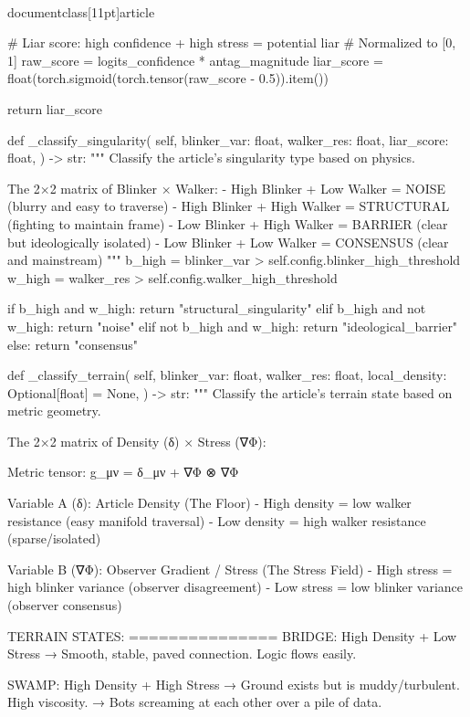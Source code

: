 \\documentclass[11pt]{article}
\begin{document}
\begin{CodeBlock}
        # Liar score: high confidence + high stress = potential liar
        # Normalized to [0, 1]
        raw_score = logits_confidence * antag_magnitude
        liar_score = float(torch.sigmoid(torch.tensor(raw_score - 0.5)).item())

        return liar_score

    def _classify_singularity(
        self,
        blinker_var: float,
        walker_res: float,
        liar_score: float,
    ) -> str:
        """
        Classify the article's singularity type based on physics.

        The 2×2 matrix of Blinker × Walker:
        - High Blinker + Low Walker = NOISE (blurry and easy to traverse)
        - High Blinker + High Walker = STRUCTURAL (fighting to maintain frame)
        - Low Blinker + High Walker = BARRIER (clear but ideologically isolated)
        - Low Blinker + Low Walker = CONSENSUS (clear and mainstream)
        """
        b_high = blinker_var > self.config.blinker_high_threshold
        w_high = walker_res > self.config.walker_high_threshold

        if b_high and w_high:
            return "structural_singularity"
        elif b_high and not w_high:
            return "noise"
        elif not b_high and w_high:
            return "ideological_barrier"
        else:
            return "consensus"

    def _classify_terrain(
        self,
        blinker_var: float,
        walker_res: float,
        local_density: Optional[float] = None,
    ) -> str:
        """
        Classify the article's terrain state based on metric geometry.

        The 2×2 matrix of Density (δ) × Stress (∇Φ):

        Metric tensor: g_μν = δ_μν + ∇Φ ⊗ ∇Φ

        Variable A (δ): Article Density (The Floor)
            - High density = low walker resistance (easy manifold traversal)
            - Low density = high walker resistance (sparse/isolated)

        Variable B (∇Φ): Observer Gradient / Stress (The Stress Field)
            - High stress = high blinker variance (observer disagreement)
            - Low stress = low blinker variance (observer consensus)

        TERRAIN STATES:
        ===============
        BRIDGE: High Density + Low Stress
            → Smooth, stable, paved connection. Logic flows easily.

        SWAMP: High Density + High Stress
            → Ground exists but is muddy/turbulent. High viscosity.
            → Bots screaming at each other over a pile of data.


\end{CodeBlock}
\end{document}
